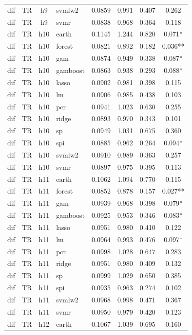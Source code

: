 \begin{ThreePartTable}
\begin{longtable}[t]{llclcccc}
dif & TR & h9 & svmlw2 & 0.0859 & 0.991 & 0.407 & 0.262\\
dif & TR & h9 & svmr & 0.0838 & 0.968 & 0.364 & 0.118\\
\addlinespace
dif & TR & h10 & earth & 0.1145 & 1.244 & 0.820 & 0.071*\\
dif & TR & h10 & forest & 0.0821 & 0.892 & 0.182 & 0.036**\\
dif & TR & h10 & gam & 0.0874 & 0.949 & 0.338 & 0.087*\\
dif & TR & h10 & gamboost & 0.0863 & 0.938 & 0.293 & 0.088*\\
dif & TR & h10 & lasso & 0.0902 & 0.981 & 0.398 & 0.115\\
dif & TR & h10 & lm & 0.0906 & 0.985 & 0.438 & 0.103\\
dif & TR & h10 & pcr & 0.0941 & 1.023 & 0.630 & 0.255\\
dif & TR & h10 & ridge & 0.0893 & 0.970 & 0.343 & 0.101\\
dif & TR & h10 & sp & 0.0949 & 1.031 & 0.675 & 0.360\\
dif & TR & h10 & spi & 0.0885 & 0.962 & 0.264 & 0.094*\\
dif & TR & h10 & svmlw2 & 0.0910 & 0.989 & 0.363 & 0.257\\
dif & TR & h10 & svmr & 0.0897 & 0.975 & 0.395 & 0.113\\
\addlinespace
dif & TR & h11 & earth & 0.1062 & 1.094 & 0.770 & 0.115\\
dif & TR & h11 & forest & 0.0852 & 0.878 & 0.157 & 0.027**\\
dif & TR & h11 & gam & 0.0939 & 0.968 & 0.398 & 0.079*\\
dif & TR & h11 & gamboost & 0.0925 & 0.953 & 0.346 & 0.083*\\
dif & TR & h11 & lasso & 0.0951 & 0.980 & 0.410 & 0.122\\
dif & TR & h11 & lm & 0.0964 & 0.993 & 0.476 & 0.097*\\
dif & TR & h11 & pcr & 0.0998 & 1.028 & 0.647 & 0.283\\
dif & TR & h11 & ridge & 0.0951 & 0.980 & 0.409 & 0.132\\
dif & TR & h11 & sp & 0.0999 & 1.029 & 0.650 & 0.385\\
dif & TR & h11 & spi & 0.0935 & 0.963 & 0.274 & 0.102\\
dif & TR & h11 & svmlw2 & 0.0968 & 0.998 & 0.471 & 0.367\\
dif & TR & h11 & svmr & 0.0950 & 0.979 & 0.420 & 0.123\\
\addlinespace
dif & TR & h12 & earth & 0.1067 & 1.039 & 0.695 & 0.160\\

\end{longtable}
\end{ThreePartTable}
